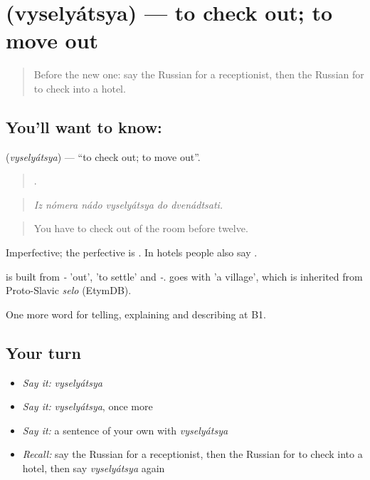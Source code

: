 \section[\texorpdfstring{\ru{выселяться} (vyselyátsya)}{выселяться (vyselyátsya)}]{ (vyselyátsya) — to check out; to move out}

\label{lesson:RU-C429-vyselyatsya}



\begin{quote}
Before the new one: say the Russian for a receptionist, then the Russian for to check into a hotel.
\end{quote}

\subsection*{You'll want to know: }
\textbf{} (\emph{vyselyátsya}) — \textquotedblleft{}to check out; to move out\textquotedblright{}.

\begin{quote}
     .
\end{quote}

\begin{quote}
\emph{Iz nómera nádo vyselyátsya do dvenádtsati.}
\end{quote}

\begin{quote}
You have to check out of the room before twelve.
\end{quote}

Imperfective; the perfective is \emph{}. In hotels people also say \emph{}.

\begin{cousinweb}
\emph{} is built from \emph{-} 'out', \emph{} 'to settle' and \emph{-}. \emph{} goes with \emph{} 'a village', which is inherited from Proto-Slavic \emph{selo} (EtymDB).
\end{cousinweb}

\begin{grammarlens}[title={What you've built}]
One more word for telling, explaining and describing at B1.
\end{grammarlens}

\subsection*{Your turn}
\begin{itemize}
\raggedright
  \item \emph{Say it:} \emph{vyselyátsya}
  \item \emph{Say it:} \emph{vyselyátsya}, once more
  \item \emph{Say it:} a sentence of your own with \emph{vyselyátsya}
  \item \emph{Recall:} say the Russian for a receptionist, then the Russian for to check into a hotel, then say \emph{vyselyátsya} again
\end{itemize}


